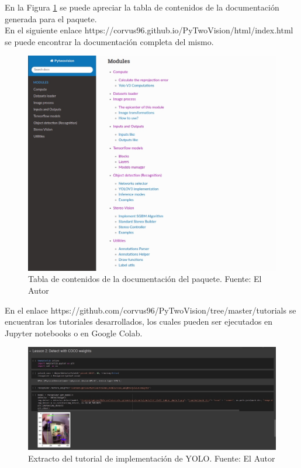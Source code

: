En la Figura \ref{doc_contents} se puede apreciar la tabla de contenidos de la documentación generada para el paquete. 
\\En el siguiente enlace https://corvus96.github.io/PyTwoVision/html/index.html se puede encontrar la documentación completa del mismo.
\begin{figure}[H]
    \centering
    \includegraphics[scale=0.5]{Recursos/doc_contents.jpg}
    \caption[Tabla de contenidos de la documentación del paquete.]{Tabla de contenidos de la documentación del paquete. {\footnotesize Fuente: El Autor}}
    \label{doc_contents}
\end{figure}
En el enlace https://github.com/corvus96/PyTwoVision/tree/master/tutorials se encuentran los tutoriales desarrollados, los cuales pueden ser ejecutados en Jupyter notebooks o en Google Colab. 
\begin{figure}[H]
    \centering
    \includegraphics[scale=0.6]{Recursos/lesson_example.jpg}
    \caption[Extracto del tutorial de implementación de YOLO.]{Extracto del tutorial de implementación de YOLO. {\footnotesize Fuente: El Autor}}
    \label{fig:my_label}
\end{figure}